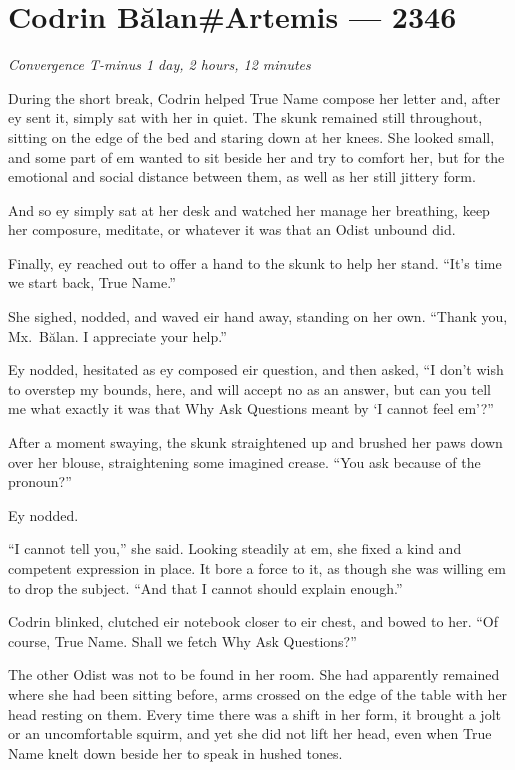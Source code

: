 \hypertarget{codrin-bux103lanartemis-2346}{%
\chapter{Codrin Bălan\#Artemis — 2346}}

\begin{center}
\emph{Convergence T-minus 1 day, 2 hours, 12 minutes}
\end{center}

\noindent During the short break, Codrin helped True Name compose her letter and, after ey sent it, simply sat with her in quiet. The skunk remained still throughout, sitting on the edge of the bed and staring down at her knees. She looked small, and some part of em wanted to sit beside her and try to comfort her, but for the emotional and social distance between them, as well as her still jittery form.

And so ey simply sat at her desk and watched her manage her breathing, keep her composure, meditate, or whatever it was that an Odist unbound did.

Finally, ey reached out to offer a hand to the skunk to help her stand. ``It's time we start back, True Name.''

She sighed, nodded, and waved eir hand away, standing on her own. ``Thank you, Mx.~Bălan. I appreciate your help.''

Ey nodded, hesitated as ey composed eir question, and then asked, ``I don't wish to overstep my bounds, here, and will accept no as an answer, but can you tell me what exactly it was that Why Ask Questions meant by `I cannot feel em'?''

After a moment swaying, the skunk straightened up and brushed her paws down over her blouse, straightening some imagined crease. ``You ask because of the pronoun?''

Ey nodded.

``I cannot tell you,'' she said. Looking steadily at em, she fixed a kind and competent expression in place. It bore a force to it, as though she was willing em to drop the subject. ``And that I cannot should explain enough.''

Codrin blinked, clutched eir notebook closer to eir chest, and bowed to her. ``Of course, True Name. Shall we fetch Why Ask Questions?''

The other Odist was not to be found in her room. She had apparently remained where she had been sitting before, arms crossed on the edge of the table with her head resting on them. Every time there was a shift in her form, it brought a jolt or an uncomfortable squirm, and yet she did not lift her head, even when True Name knelt down beside her to speak in hushed tones.

